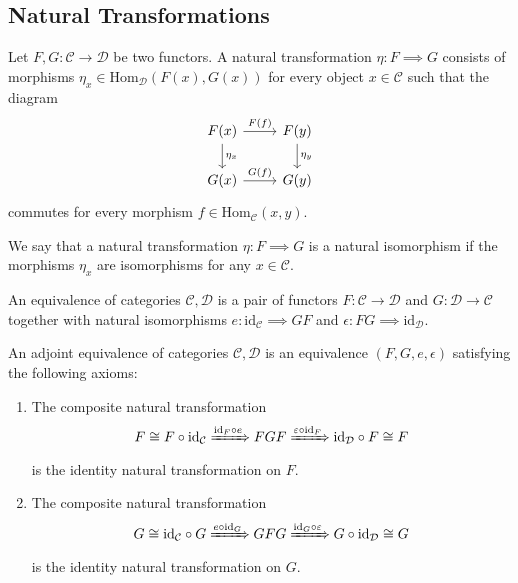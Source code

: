 \subsection{Natural Transformations} %
\label{sub:natural_transformations}

\begin{definition}
  Let $ F,G:\mathcal{C} \to \mathcal{D} $ be two functors. A natural transformation $ \eta: F \implies G $ consists
  of morphisms $ \eta_x \in \text{Hom}_\mathcal{D}(F(x), G(x)) $ for every object $ x \in \mathcal{C} $ such that the diagram
  \[\begin{tikzcd}
	{F(x)} & {F(y)} \\
	{G(x)} & {G(y)}
	\arrow["{F(f)}", from=1-1, to=1-2]
	\arrow["{G(f)}", from=2-1, to=2-2]
	\arrow["{\eta_x}", from=1-1, to=2-1]
	\arrow["{\eta_y}", from=1-2, to=2-2]
\end{tikzcd}\]
commutes for every morphism $ f \in \text{Hom}_\mathcal{C}(x,y) $.

We say that a natural transformation $ \eta:F \implies G $ is a natural isomorphism if the morphisms $ \eta_x $ are isomorphisms for any $ x \in \mathcal{C} $.
\end{definition}

\begin{definition}
  An equivalence of categories $ \mathcal{C}, \mathcal{D} $ is a pair of functors $ F: \mathcal{C}\to \mathcal{D} $ and $ G:\mathcal{D} \to \mathcal{C} $ together with natural isomorphisms $ e: \text{id}_\mathcal{C} \implies GF $ and $ \epsilon: FG \implies \text{id}_\mathcal{D} $.
\end{definition}

\begin{definition}
  An adjoint equivalence of categories $ \mathcal{C}, \mathcal{D} $ is an equivalence $ (F,G,e,\epsilon) $ satisfying the following axioms:
  \begin{enumerate}
    \item The composite natural transformation
      \begin{equation*}
        F \cong F \circ \text{id}_\mathcal{C} \xRightarrow{\text{id}_F \circ e} FGF \xRightarrow{\epsilon\circ \text{id}_F} \text{id}_\mathcal{D} \circ F \cong F
      \end{equation*}
      is the identity natural transformation on $ F $.

    \item The composite natural transformation
      \begin{equation*}
        G \cong \text{id}_\mathcal{C}\circ G   \xRightarrow{e \circ \text{id}_G} GFG \xRightarrow{\text{id}_G \circ \epsilon} G \circ \text{id}_\mathcal{D} \cong G
      \end{equation*}
      is the identity natural transformation on $ G $.
  \end{enumerate}
\end{definition}
